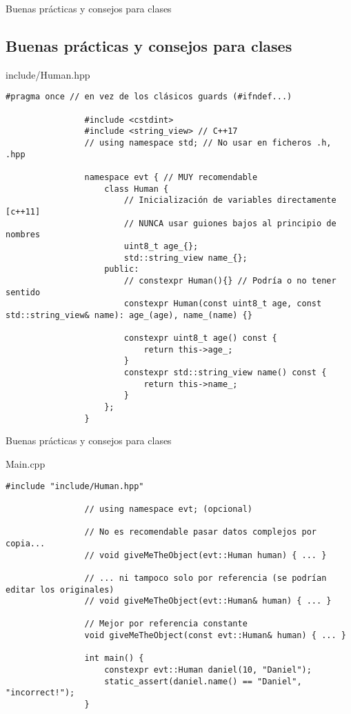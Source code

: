\documentclass{beamer}
\newcommand{\normalSizeItem}[1] {
  \normalsize{\item #1}
}
\newcommand{\smallCite}[1]{
	\begin{small}
		\cite{#1}	
	\end{small}
}
\begin{document}
		\begin{frame}[fragile]{Buenas prácticas y consejos para clases \smallCite{cppbestpractices}}	
			\subsection{Buenas prácticas y consejos para clases}
			\begin{itemize}
				\normalSizeItem { include/Human.hpp }
				\begin{lstlisting}[basicstyle={\tiny\ttfamily}]
				#pragma once // en vez de los clásicos guards (#ifndef...)
				
				#include <cstdint>
				#include <string_view> // C++17
				// using namespace std; // No usar en ficheros .h, .hpp

				namespace evt { // MUY recomendable
					class Human {
						// Inicialización de variables directamente [c++11]
						// NUNCA usar guiones bajos al principio de nombres
						uint8_t age_{};
						std::string_view name_{};
					public:
						// constexpr Human(){} // Podría o no tener sentido
						constexpr Human(const uint8_t age, const std::string_view& name): age_(age), name_(name) {}
						
						constexpr uint8_t age() const {  
							return this->age_;
						}
						constexpr std::string_view name() const { 
							return this->name_;
						}
					};
				}
				\end{lstlisting}
			\end{itemize}
		\end{frame}
		
		\begin{frame}[fragile]{Buenas prácticas y consejos para clases}	
			\begin{itemize}
				\normalSizeItem { Main.cpp }
				\begin{lstlisting}[basicstyle={\tiny\ttfamily}]
				#include "include/Human.hpp"
				
				// using namespace evt; (opcional)
				
				// No es recomendable pasar datos complejos por copia...
				// void giveMeTheObject(evt::Human human) { ... }
				
				// ... ni tampoco solo por referencia (se podrían editar los originales)
				// void giveMeTheObject(evt::Human& human) { ... }
				
				// Mejor por referencia constante
				void giveMeTheObject(const evt::Human& human) { ... }
				
				int main() {
					constexpr evt::Human daniel(10, "Daniel");
					static_assert(daniel.name() == "Daniel", "incorrect!");
				}
				\end{lstlisting}
			\end{itemize}
		\end{frame}
		
\end{document}
